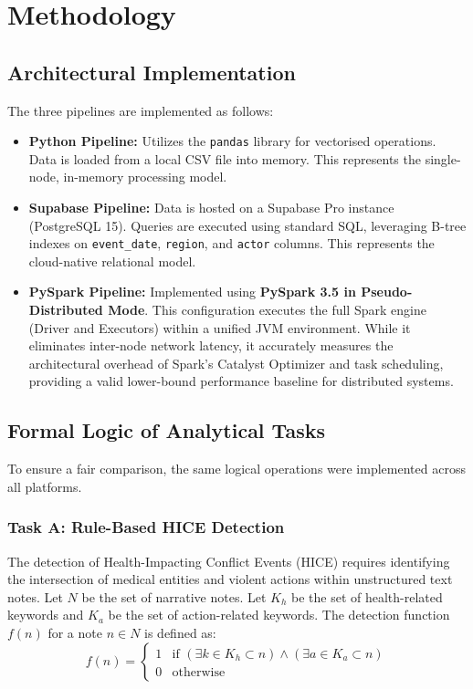 \documentclass[conference]{IEEEtran}
\begin{document}
\section{Methodology}

\subsection{Architectural Implementation}
The three pipelines are implemented as follows:
\begin{itemize}
    \item \textbf{Python Pipeline:} Utilizes the \texttt{pandas} library for vectorised operations. Data is loaded from a local CSV file into memory. This represents the single-node, in-memory processing model.
    \item \textbf{Supabase Pipeline:} Data is hosted on a Supabase Pro instance (PostgreSQL 15). Queries are executed using standard SQL, leveraging B-tree indexes on \texttt{event\_date}, \texttt{region}, and \texttt{actor} columns. This represents the cloud-native relational model.
    \item \textbf{PySpark Pipeline:} Implemented using \textbf{PySpark 3.5 in Pseudo-Distributed Mode}. This configuration executes the full Spark engine (Driver and Executors) within a unified JVM environment. While it eliminates inter-node network latency, it accurately measures the architectural overhead of Spark's Catalyst Optimizer and task scheduling, providing a valid lower-bound performance baseline for distributed systems.
\end{itemize}

\subsection{Formal Logic of Analytical Tasks}
To ensure a fair comparison, the same logical operations were implemented across all platforms.

\subsubsection{Task A: Rule-Based HICE Detection}
The detection of Health-Impacting Conflict Events (HICE) requires identifying the intersection of medical entities and violent actions within unstructured text notes. 
Let $N$ be the set of narrative notes. Let $K_h$ be the set of health-related keywords and $K_a$ be the set of action-related keywords. The detection function $f(n)$ for a note $n \in N$ is defined as:
\begin{equation}
f(n) = 
\begin{cases} 
1 & \text{if } (\exists k \in K_h \subset n) \land (\exists a \in K_a \subset n) \\
0 & \text{otherwise}
\end{cases}
\end{equation}
\end{document}
